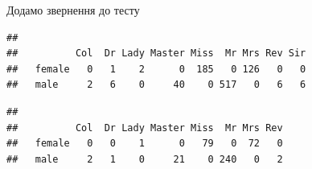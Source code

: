 \documentclass[ignorenonframetext,]{beamer}
\newenvironment{Shaded}{\begin{snugshade}}{\end{snugshade}}
\newcommand{\CharTok}[1]{\textcolor[rgb]{0.31,0.60,0.02}{#1}}
\newcommand{\KeywordTok}[1]{\textcolor[rgb]{0.13,0.29,0.53}{\textbf{#1}}}
\newcommand{\NormalTok}[1]{#1}
\newcommand{\OperatorTok}[1]{\textcolor[rgb]{0.81,0.36,0.00}{\textbf{#1}}}
\newcommand{\StringTok}[1]{\textcolor[rgb]{0.31,0.60,0.02}{#1}}
\begin{document}
\begin{frame}[fragile]{Додамо звернення до тесту}
\protect\hypertarget{ux434ux43eux434ux430ux43cux43e-ux437ux432ux435ux440ux43dux435ux43dux43dux44f-ux434ux43e-ux442ux435ux441ux442ux443}{}

\begin{Shaded}
\end{Shaded}

\begin{verbatim}
##         
##          Col  Dr Lady Master Miss  Mr Mrs Rev Sir
##   female   0   1    2      0  185   0 126   0   0
##   male     2   6    0     40    0 517   0   6   6
\end{verbatim}

\begin{Shaded}
\end{Shaded}

\begin{verbatim}
##         
##          Col  Dr Lady Master Miss  Mr Mrs Rev
##   female   0   0    1      0   79   0  72   0
##   male     2   1    0     21    0 240   0   2
\end{verbatim}

\end{frame}
\end{document}
